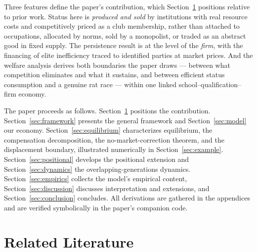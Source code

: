 \documentclass[12pt,letterpaper]{article}
\theoremstyle{definition}
\begin{document}
Three features define the paper's contribution, which Section~\ref{sec:lit} positions relative to prior work.
Status here is \emph{produced and sold} by institutions with real resource costs and competitively priced as a club membership, rather than attached to occupations, allocated by norms, sold by a monopolist, or traded as an abstract good in fixed supply.
The persistence result is at the level of the \emph{firm}, with the financing of elite inefficiency traced to identified parties at market prices.
And the welfare analysis derives both boundaries the paper draws --- between what competition eliminates and what it sustains, and between efficient status consumption and a genuine rat race --- within one linked school--qualification--firm economy.

The paper proceeds as follows.
Section~\ref{sec:lit} positions the contribution.
Section~\ref{sec:framework} presents the general framework and Section~\ref{sec:model} our economy.
Section~\ref{sec:equilibrium} characterizes equilibrium, the compensation decomposition, the no-market-correction theorem, and the displacement boundary, illustrated numerically in Section~\ref{sec:example}.
Section~\ref{sec:positional} develops the positional extension and Section~\ref{sec:dynamics} the overlapping-generations dynamics.
Section~\ref{sec:empirics} collects the model's empirical content, Section~\ref{sec:discussion} discusses interpretation and extensions, and Section~\ref{sec:conclusion} concludes.
All derivations are gathered in the appendices and are verified symbolically in the paper's companion code.

\section{Related Literature}\label{sec:lit}
\end{document}
